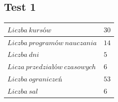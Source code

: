 \subsection{Test 1}
\begin{table}[H]
\begin{center}
 
\begin{tabular}{ |l|l| }
\hline
$Liczba\ kursów$ & $30$\\
\hline
$Liczba\ programów\ nauczania$ & $14$\\
\hline
$Liczba\ dni$ & $5$ \\
\hline
$Licza\ przedziałów\ czasowych$ & $6$ \\
\hline
$Liczba\ ograniczeń$ & $53$ \\
\hline
$Liczba\ sal$ & $6$ \\
\hline
\end{tabular}
\end{center}
\end{table}

